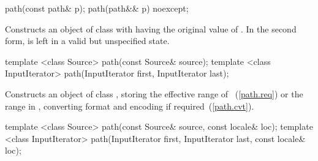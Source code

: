 \begin{itemdecl}
path(const path& p);
path(path&& p) noexcept;
\end{itemdecl}

\begin{itemdescr}
\pnum
\effects
Constructs an object of class  with
 having the original value of .
In the second form,  is left in a valid but unspecified state.
\end{itemdescr}

\begin{itemdecl}
template <class Source>
  path(const Source& source);
template <class InputIterator>
  path(InputIterator first, InputIterator last);
\end{itemdecl}

\begin{itemdescr}
\pnum
\effects Constructs an object of class , storing the effective range of ~(\ref{path.req})
  or the range  in ,
  converting format and encoding if required~(\ref{path.cvt}).
\end{itemdescr}

\begin{itemdecl}
template <class Source>
  path(const Source& source, const locale& loc);
template <class InputIterator>
  path(InputIterator first, InputIterator last, const locale& loc);
\end{itemdecl}

